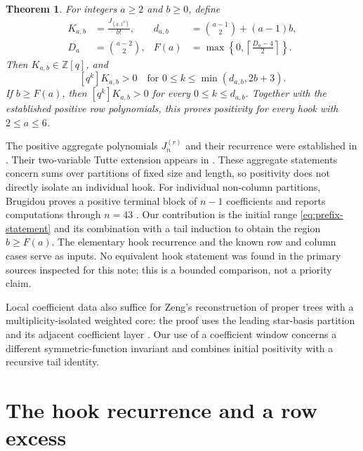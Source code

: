 \documentclass[11pt]{article}
\newtheorem{theorem}{Theorem}
\newcommand{\Z}{\mathbb Z}
\newcommand{\coeff}[2]{[q^{#1}]#2}
\begin{document}
\begin{theorem}\label{thm:main}
For integers $a\geq2$ and $b\geq0$, define
\begin{align*}
 K_{a,b}&=\frac{J_{(a,1^b)}}{b!},&
 d_{a,b}&=\binom{a-1}{2}+(a-1)b,\\
 D_a&=\binom{a-2}{2},&
 F(a)&=\max\left\{0,\left\lceil\frac{D_a-4}{2}\right\rceil\right\}.
\end{align*}
Then $K_{a,b}\in\Z[q]$, and
\begin{equation}\label{eq:prefix-statement}
 \coeff{k}{K_{a,b}}>0
 \quad\text{for }0\leq k\leq\min(d_{a,b},2b+3).
\end{equation}
If $b\geq F(a)$, then $\coeff{k}{K_{a,b}}>0$ for every
$0\leq k\leq d_{a,b}$. Together with the established positive row
polynomials, this proves positivity for every hook with $2\leq a\leq6$.
\end{theorem}

The positive aggregate polynomials $J_n^{(r)}$ and their recurrence were
established in \cite[Theorem~6.3]{BrugidouAnalog}. Their two-variable
Tutte extension appears in \cite[Theorem~1.1]{BrugidouTutte}. These
aggregate statements concern sums over partitions of fixed size and
length, so positivity does not directly isolate an individual hook.
For individual non-column partitions, Brugidou proves a positive terminal block of
$n-1$ coefficients and reports computations through $n=43$
\cite[Corollary~5.2 and Section~4]{BrugidouMonomial}.
Our contribution is the initial range \eqref{eq:prefix-statement} and its
combination with a tail induction to obtain the region $b\geq F(a)$.
The elementary hook recurrence and the known row and column cases serve
as inputs. No equivalent hook statement was found in the primary sources
inspected for this note; this is a bounded comparison, not a priority claim.

Local coefficient data also suffice for Zeng's reconstruction of proper
trees with a multiplicity-isolated weighted core: the proof uses the
leading star-basis partition and its adjacent coefficient layer
\cite[Theorem~1.1 and Lemma~2.2]{ZengMultiplicity}. Our use of a coefficient
window concerns a different symmetric-function invariant and combines
initial positivity with a recursive tail identity.

\section{The hook recurrence and a row excess}
\end{document}
